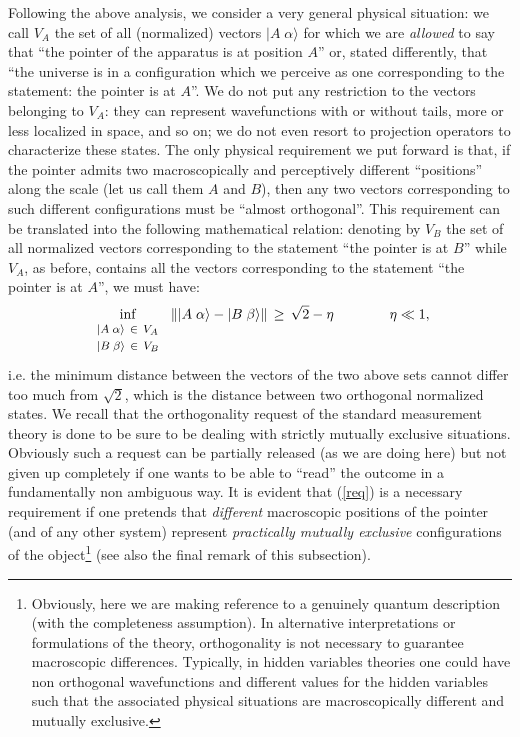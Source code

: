 \documentclass[10pt,a4paper]{article}
\begin{document}
Following the above analysis, we consider a very general physical
situation: we call $V_{A}$ the set of all (normalized) vectors $
|A\; \alpha\rangle$ for which we are {\it allowed} to say that
``the pointer of the apparatus is at position $A$'' or, stated
differently, that ``the universe is in a configuration which we
perceive as one corresponding to the statement: the pointer is at
$A$''. We do not put any restriction to the vectors belonging to
$V_{A}$: they can represent wavefunctions with or without tails,
more or less localized in space, and so on; we do not even resort
to projection operators to characterize these states. The only
physical requirement we put forward is that, if the pointer admits
two macroscopically and perceptively different ``positions'' along
the scale (let us call them $A$ and $B$), then any two vectors
corresponding to such different configurations must be ``almost
orthogonal''. This requirement can be translated into the
following mathematical relation: denoting by $V_{B}$ the set of
all normalized vectors corresponding to the statement ``the
pointer is at $B$'' while $V_{A}$, as before, contains all the
vectors corresponding to the statement ``the pointer is at $A$'',
we must have:
\begin{equation} \label{req}
\inf_{\begin{array}{l}
\makebox{\footnotesize $|A\;\alpha\rangle \,\in\, V_{A}$} \\
\makebox{\footnotesize $|B\;\beta\rangle \,\in\, V_{B}$}
\end{array}}\, \| |A\;\alpha\rangle -
|B\;\beta\rangle \|\, \geq\, \sqrt{2} - \eta \qquad\qquad \eta \ll
1,
\end{equation}
i.e. the minimum distance between the vectors of the two above
sets cannot differ too much from $\sqrt{2}$, which is the distance
between two orthogonal normalized states. We recall that the
orthogonality request of the standard measurement theory is done
to be sure to be dealing with strictly mutually exclusive
situations. Obviously such a request can be partially released (as
we are doing here) but not given up completely if one wants to be
able to ``read'' the outcome in a fundamentally non ambiguous way.
It is evident that  (\ref{req}) is a necessary requirement if one
pretends that {\it different} macroscopic positions of the pointer
(and of any other system) represent {\it practically mutually exclusive}
configurations of the object\footnote{Obviously, here we are
making reference to a genuinely quantum description (with the
completeness assumption). In alternative interpretations or
formulations of the theory, orthogonality is not necessary  to
guarantee macroscopic differences. Typically, in hidden variables
theories one could have non orthogonal wavefunctions and different
values for the hidden variables such that the associated physical
situations are macroscopically different and mutually exclusive.}
(see also the final remark of this subsection).
\end{document}
